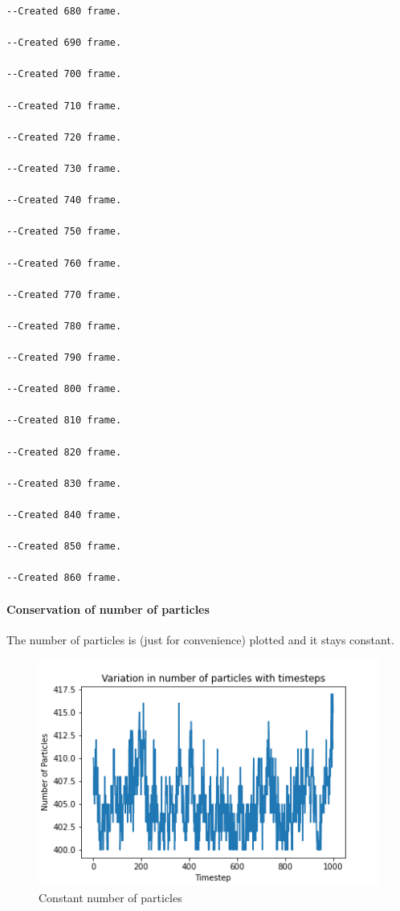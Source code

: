 \documentclass[
]{article}
\begin{document}
\begin{verbatim}
--Created 680 frame.

--Created 690 frame.

--Created 700 frame.

--Created 710 frame.

--Created 720 frame.

--Created 730 frame.

--Created 740 frame.

--Created 750 frame.

--Created 760 frame.

--Created 770 frame.

--Created 780 frame.

--Created 790 frame.

--Created 800 frame.

--Created 810 frame.

--Created 820 frame.

--Created 830 frame.

--Created 840 frame.

--Created 850 frame.

--Created 860 frame.
\end{verbatim}

\hypertarget{conservation-of-number-of-particles}{%
\paragraph{Conservation of number of
particles}\label{conservation-of-number-of-particles}}

The number of particles is (just for convenience) plotted and it stays
constant.

\begin{figure}
\centering
\includegraphics{Assets/number_particles.png}
\caption{Constant number of particles}
\end{figure}
\end{document}
